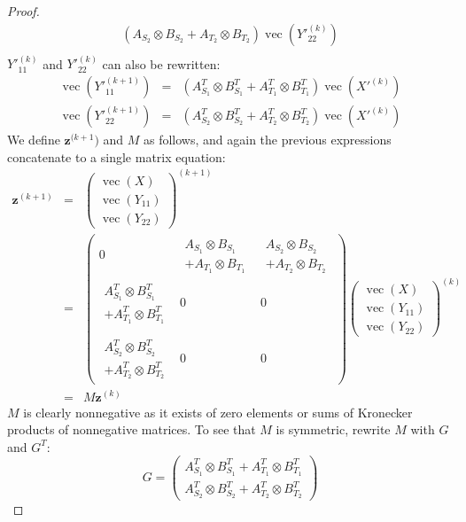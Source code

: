 \documentclass[a4paper,11pt]{report}
\newcommand{\vect}{\operatorname{vec}}
\begin{document}
\begin{proof}
\begin{eqnarray*}
  (A_{S_2} \otimes  B_{S_2} + A_{T_2} \otimes B_{T_2})\vect(Y'^{(k)}_{22})\\
\end{eqnarray*}
$Y'^{(k)}_{11}$ and $Y'^{(k)}_{22}$ can also be rewritten:
\begin{eqnarray*}
  \vect(Y'^{(k+1)}_{11}) &=& (A^T_{S_1} \otimes  B^T_{S_1} + A^T_{T_1} \otimes B^T_{T_1})\vect(X'^{(k)})\\
  \vect(Y'^{(k+1)}_{22}) &=& (A^T_{S_2} \otimes  B^T_{S_2} + A^T_{T_2} \otimes B^T_{T_2})\vect(X'^{(k)})
\end{eqnarray*}
We define $\mathbf{z}^{(k+1})$ and $M$ as follows, and again the previous 
expressions concatenate to a single matrix equation:
\begin{eqnarray*}
  \mathbf{z}^{(k+1)} &=& \begin{pmatrix}
  \vect(X)\\
  \vect(Y_{11})\\
  \vect(Y_{22})
  \end{pmatrix}^{(k+1)}\\
  &=& \left(\begin{array}{lll}  
  0 &  \begin{array}{l}
A_{S_1} \otimes  B_{S_1}\\ + A_{T_1} \otimes B_{T_1}\end{array}   & \begin{array}{l}
 A_{S_2} \otimes  B_{S_2}\\ + A_{T_2} \otimes 
  B_{T_2}\end{array} \\
\begin{array}{l}
 A^T_{S_1} \otimes  B^T_{S_1}\\ + A^T_{T_1} \otimes B^T_{T_1}\end{array}   & 0  & 
 0\\\\
 \begin{array}{l} A^T_{S_2} \otimes  B^T_{S_2}\\ + A^T_{T_2} \otimes B^T_{T_2}\end{array} & 0 & 0
  \end{array}\right)\begin{pmatrix}
  \vect(X)\\
  \vect(Y_{11})\\
  \vect(Y_{22})
  \end{pmatrix}^{(k)}\\
  &=& M\mathbf{z}^{(k)}
\end{eqnarray*}
$M$ is clearly nonnegative as it exists of zero elements or sums of Kronecker 
products of nonnegative matrices. To see that $M$ is symmetric, rewrite $M$ with $G$ 
and $G^T$:
$$G = \begin{pmatrix}
A^T_{S_1} \otimes  B^T_{S_1} + A^T_{T_1} \otimes B^T_{T_1}\\
A^T_{S_2} \otimes  B^T_{S_2} + A^T_{T_2} \otimes B^T_{T_2}
\end{pmatrix}$$


\end{proof}
\end{document}
